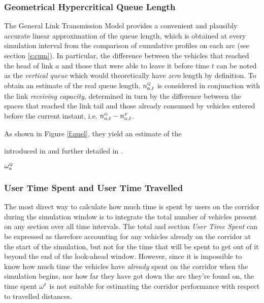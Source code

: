\subsubsection{Geometrical Hypercritical Queue Length}
The General Link Transmission Model provides a convenient and plausibly accurate linear approximation of the queue length, which is obtained at every simulation interval from the comparison of cumulative profiles on each arc (see section \ref{s:cum}). In particular, the difference between the vehicles that reached the head of link $a$ and those that were able to leave it before time $t$ can be noted as the \emph{vertical queue}
which would theoretically have \emph{zero} length by definition.
To obtain an estimate of the real queue length, $n_{a,t}^{\scriptscriptstyle{Q}}$ is considered in conjunction with the link \emph{receiving capacity}, determined in turn by the difference between the spaces that reached the link tail and those already consumed by vehicles entered before the current instant, i.e. $n_{a,t}^{\scriptscriptstyle{G}} - n_{a,t}^{\scriptscriptstyle{F}}$. 

As shown in Figure \ref{f:quel}, they yield an estimate of the 


introduced in \citep{gentile2010general} and further detailed in \citep{tiddi2012models}.
 
$\omega_{a}^{\scriptscriptstyle{Q}}$

\subsubsection*{User Time Spent and User Time Travelled}
The most direct way to calculate how much time is spent by users on the corridor during the simulation window is to integrate the total number of vehicles present on any section over all time intervals. The total and section \emph{User Time Spent} can be expressed as
therefore accounting for any vehicles already on the corridor at the start of the simulation, but not for the time that will be spent to get out of it beyond the end of the look-ahead window.
However, since it is impossible to know how much time the vehicles have \emph{already} spent on the corridor when the simulation begins, nor how far they have got down the arc they're found on, the time spent $\omega_{}^{t}$ is not suitable for estimating the corridor performance with respect to travelled distances. 

